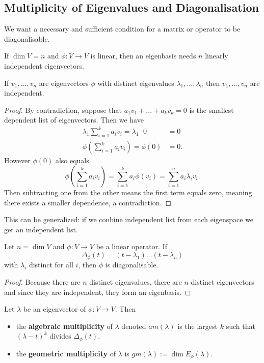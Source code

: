 \subsection{Multiplicity of Eigenvalues and Diagonalisation}

We want a necessary and sufficient condition for a matrix or operator to be diagonalisable.


If $\dim V = n$ and $\phi : V \rightarrow V$ is linear, then an eigenbasis needs $n$ linearly independent eigenvectors.

\begin{theorem}
    If $v_1,...,v_n$ are eigenvectors $\phi$ with distinct eigenvalues $\lambda_1,...,\lambda_n$ then $v_1,...,v_n$ are independent.
\end{theorem}
\begin{proof}
    By contradiction, suppose that $a_1 v_1 + ... + a_k v_k = 0$ is the smallest dependent list of eigenvectors. Then we have
    \begin{align*}
      \lambda_1 \sum_{ i = 1}^{k} a_i v_i = \lambda_1 \cdot 0 &= 0 \\
      \phi \left( \sum_{ i = 1}^{k} a_i v_i \right) = \phi(0) &= 0 
    .\end{align*}
    However $\phi(0)$ also equals
    \[ \phi \left( \sum_{ i = 1}^{k} a_i v_i \right) = \sum_{ i = 1}^{k} a_i \phi(v_i) = \sum_{ i = 1}^{n} a_i \lambda_i v_i.\]
    Then subtracting one from the other means the first term equals zero, meaning there exists a smaller dependence, a contradiction.
\end{proof}

\begin{remark}
    This can be generalized: if we conbine independent list from each eigenspace we get an independent list.
\end{remark}

\begin{corollary}
Let $n = \dim V$ and $\phi : V \rightarrow V$ be a linear operator. If 
\[\Delta_\phi(t) = (t - \lambda_1)...(t - \lambda_n)\]
with $\lambda_i$ distinct for all $i$, then $\phi$ is diagonalisable.
\end{corollary} 
\begin{proof}
  Because there are $n$ distinct eigenvalues, there are $n$ distinct eigenvectors and since they are independent, they form an eigenbasis.
\end{proof}


\begin{definition}
    Let $\lambda$ be an eigenvector of $\phi: V \rightarrow V$. Then
    \begin{itemize}
    \item the {\bf algebraic multiplicity} of $\lambda$ denoted $am(\lambda)$ is the largest $k$ such that $(\lambda - t)^k$ divides $\Delta_\phi(t)$.
    \item the {\bf geometric multiplicity} of $\lambda$ is $gm(\lambda) := \dim E_\phi(\lambda)$.
    \end{itemize}
\end{definition}

